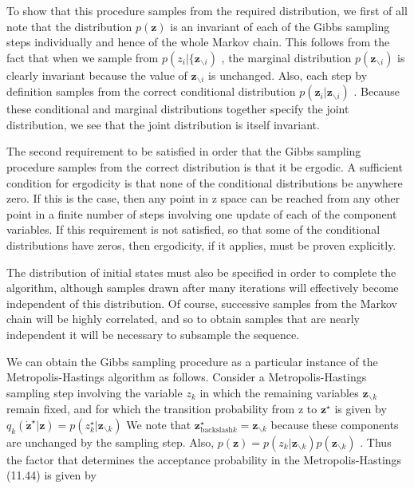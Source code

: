 \documentclass[
  10
]{article}
\newcounter{none} %
\begin{document}
To show that this procedure samples from the required distribution, we
first of all note that the distribution \(p ( \mathbf { z } )\) is an
invariant of each of the Gibbs sampling steps individually and hence of
the whole Markov chain. This follows from the fact that when we sample
from \(p ( z _ { i } | \{ \mathbf { z } _ { \backslash i } )\) , the
marginal distribution \(p ( \mathbf { z } _ { \backslash i } )\) is
clearly invariant because the value of
\(\mathbf { z } _ { \backslash i }\) is unchanged. Also, each step by
definition samples from the correct conditional distribution
\(p ( \boldsymbol { z } _ { i } | \mathbf { z } _ { \backslash i } )\) .
Because these conditional and marginal distributions together specify
the joint distribution, we see that the joint distribution is itself
invariant.

The second requirement to be satisfied in order that the Gibbs sampling
procedure samples from the correct distribution is that it be ergodic. A
sufficient condition for ergodicity is that none of the conditional
distributions be anywhere zero. If this is the case, then any point in z
space can be reached from any other point in a finite number of steps
involving one update of each of the component variables. If this
requirement is not satisfied, so that some of the conditional
distributions have zeros, then ergodicity, if it applies, must be proven
explicitly.

The distribution of initial states must also be specified in order to
complete the algorithm, although samples drawn after many iterations
will effectively become independent of this distribution. Of course,
successive samples from the Markov chain will be highly correlated, and
so to obtain samples that are nearly independent it will be necessary to
subsample the sequence.

We can obtain the Gibbs sampling procedure as a particular instance of
the Metropolis-Hastings algorithm as follows. Consider a
Metropolis-Hastings sampling step involving the variable \(z _ { k }\)
in which the remaining variables \(\mathbf { z } _ { \backslash k }\)
remain fixed, and for which the transition probability from z to
\(\mathbf { z } ^ { \star }\) is given by
\(q _ { k } ( \mathbf { \dot { z } } ^ { \star } \vert \mathbf { z } ) = p ( z _ { k } ^ { \star } \vert \mathbf { z } _ { \backslash k } )\)
We note that
\(\mathbf { z } _ { \mathrm { backslash } k } ^ { \star } = \mathbf { z } _ { \mathrm { \backslash } k }\)
because these components are unchanged by the sampling step. Also,
\(p ( \mathbf { z } ) = p ( z _ { k } | \mathbf { z } _ { \backslash k } ) p ( \mathbf { z } _ { \backslash k } )\)
. Thus the factor that determines the acceptance probability in the
Metropolis-Hastings (11.44) is given by
\end{document}

